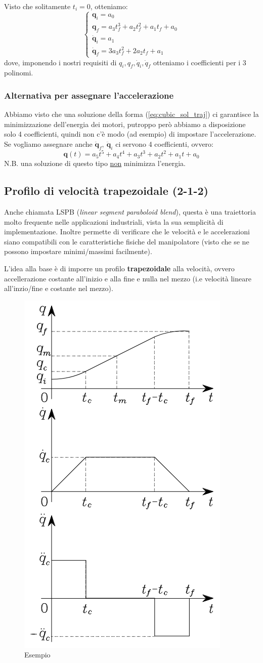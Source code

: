 Visto che solitamente $t_i = 0$, otteniamo:
$$
\boxed{
\begin{cases*}
	\bm{q}_i = a_0 \\
	\bm{q}_f = a_3t_f^3 + a_2t_f^2 + a_1t_f + a_0 \\
	\bm{\dot{q}}_i = a_1 \\
	\bm{\dot{q}}_f = 3a_3t_f^2 + 2a_2t_f + a_1
\end{cases*}
}
$$
dove, imponendo i nostri requisiti di $q_i,q_f,	\dot{q}_i,\dot{q}_f$ otteniamo i coefficienti per i 3 polinomi.



\vspace*{10pt}
\subsubsection{Alternativa per assegnare l'accelerazione}
Abbiamo visto che una soluzione della forma (\ref{eq:cubic_sol_traj}) ci garantisce la minimizzazione dell'energia dei motori, putroppo però abbiamo a disposizione solo 4 coefficienti, quindi non c'è modo (ad esempio) di impostare l'accelerazione. Se vogliamo assegnare anche $\ddot{\bm{q}}_f, \ \ddot{\bm{q}}_i$ ci servono 4 coefficienti, ovvero:
$$
\bm{q}(t) = a_5t^5 + a_4t^4 + a_3t^3 + a_2t^2 + a_1t + a_0
$$
N.B. una soluzione di questo tipo \underline{non} minimizza l'energia.



\vspace*{10pt}
\subsection{Profilo di velocità trapezoidale (2-1-2)}

Anche chiamata LSPB (\textit{linear segment paraboloid blend}), questa è una traiettoria molto frequente nelle applicazioni industriali, vista la sua semplicità di implementazione. Inoltre permette di verificare che le velocità e le accelerazioni siano compatibili con le caratteristiche fisiche del manipolatore (visto che se ne possono impostare minimi/massimi facilmente).

L'idea alla base è di imporre un profilo \textbf{trapezoidale} alla velocità, ovvero accellerazione costante all'inizio e alla fine e nulla nel mezzo (i.e velocità lineare all'inzio/fine e costante nel mezzo).

\begin{figure}[H]
	\centering
	\includegraphics[width=0.3\linewidth]{images/trajectories_7}
	\caption{Esempio}
	\label{fig:trajectories7}
\end{figure}

